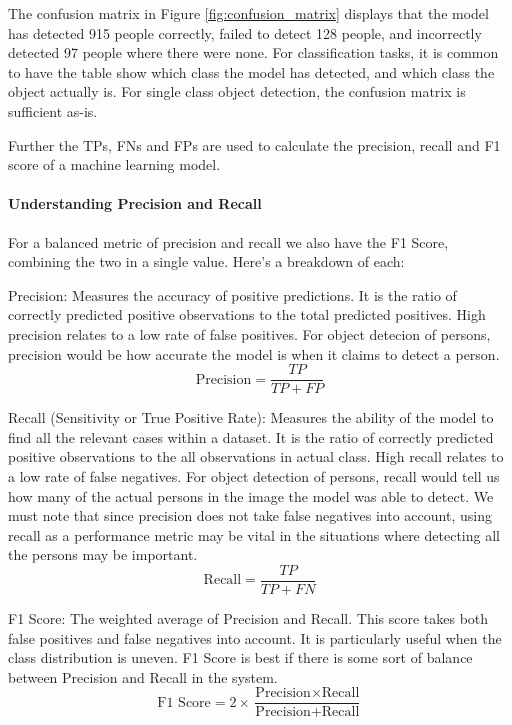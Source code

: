 The confusion matrix in Figure \ref{fig:confusion_matrix} displays that the model has detected 915 people correctly, failed to detect 128 people, and incorrectly detected 97 people where there were none. For classification tasks, it is common to have the table show which class the model has detected, and which class the object actually is. For single class object detection, the confusion matrix is sufficient as-is.

Further the TPs, FNs and FPs are used to calculate the precision, recall and F1 score of a machine learning model.

\paragraph{Understanding Precision and Recall}
\label{sec:understandingprecision}
For a balanced metric of precision and recall we also have the F1 Score, combining the two in a single value. Here’s a breakdown of each:

Precision: Measures the accuracy of positive predictions. It is the ratio of correctly predicted positive observations to the total predicted positives. High precision relates to a low rate of false positives. For object detecion of persons, precision would be how accurate the model is when it claims to detect a person.
\begin{equation}
    \text{Precision} = \frac{TP}{TP + FP}
\end{equation}

Recall (Sensitivity or True Positive Rate): Measures the ability of the model to find all the relevant cases within a dataset. It is the ratio of correctly predicted positive observations to the all observations in actual class. High recall relates to a low rate of false negatives. For object detection of persons, recall would tell us how many of the actual persons in the image the model was able to detect. We must note that since precision does not take false negatives into account, using recall as a performance metric may be vital in the situations where detecting all the persons may be important.
\begin{equation}
    \text{Recall} = \frac{TP}{TP + FN}
\end{equation}

F1 Score: The weighted average of Precision and Recall. This score takes both false positives and false negatives into account. It is particularly useful when the class distribution is uneven. F1 Score is best if there is some sort of balance between Precision and Recall in the system.
\begin{equation}
    \text{F1 Score} = 2 \times \frac{\text{Precision} \times \text{Recall}}{\text{Precision} + \text{Recall}}
\end{equation}

